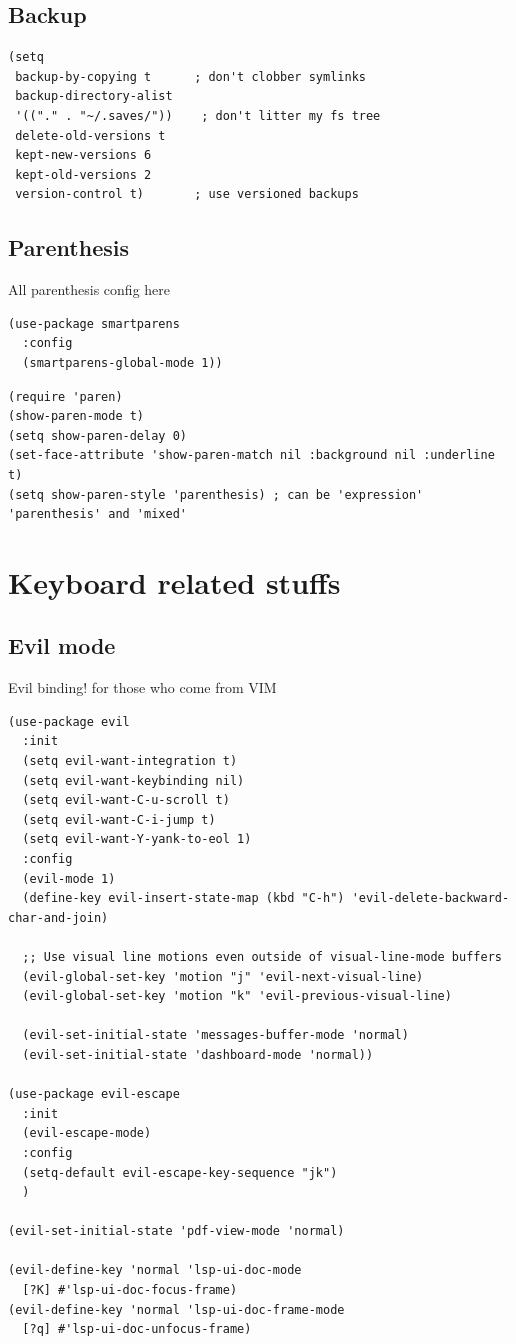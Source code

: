 \documentclass[11pt]{article}
\begin{document}
\subsection{Backup}
\label{sec:org6059a6d}
\begin{verbatim}
(setq
 backup-by-copying t      ; don't clobber symlinks
 backup-directory-alist
 '(("." . "~/.saves/"))    ; don't litter my fs tree
 delete-old-versions t
 kept-new-versions 6
 kept-old-versions 2
 version-control t)       ; use versioned backups
\end{verbatim}

\subsection{Parenthesis}
\label{sec:orgf49dc08}

All parenthesis config here

\begin{verbatim}
(use-package smartparens
  :config
  (smartparens-global-mode 1))
\end{verbatim}

\begin{verbatim}
(require 'paren)
(show-paren-mode t)
(setq show-paren-delay 0)
(set-face-attribute 'show-paren-match nil :background nil :underline t)
(setq show-paren-style 'parenthesis) ; can be 'expression' 'parenthesis' and 'mixed'
\end{verbatim}

\section{Keyboard related stuffs}
\label{sec:org81468ef}
\subsection{Evil mode}
\label{sec:orge5576f2}

Evil binding! for those who come from VIM

\begin{verbatim}
(use-package evil
  :init
  (setq evil-want-integration t)
  (setq evil-want-keybinding nil)
  (setq evil-want-C-u-scroll t)
  (setq evil-want-C-i-jump t)
  (setq evil-want-Y-yank-to-eol 1)
  :config
  (evil-mode 1)
  (define-key evil-insert-state-map (kbd "C-h") 'evil-delete-backward-char-and-join)

  ;; Use visual line motions even outside of visual-line-mode buffers
  (evil-global-set-key 'motion "j" 'evil-next-visual-line)
  (evil-global-set-key 'motion "k" 'evil-previous-visual-line)

  (evil-set-initial-state 'messages-buffer-mode 'normal)
  (evil-set-initial-state 'dashboard-mode 'normal))

(use-package evil-escape
  :init
  (evil-escape-mode)
  :config
  (setq-default evil-escape-key-sequence "jk")
  )

(evil-set-initial-state 'pdf-view-mode 'normal)

(evil-define-key 'normal 'lsp-ui-doc-mode
  [?K] #'lsp-ui-doc-focus-frame)
(evil-define-key 'normal 'lsp-ui-doc-frame-mode
  [?q] #'lsp-ui-doc-unfocus-frame)

\end{verbatim}
\end{document}
